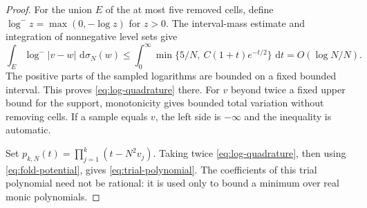 \documentclass[11pt,letterpaper]{article}
\theoremstyle{definition}
\newcommand{\dd}{\,\mathrm d}
\begin{document}
\begin{proof}
For the union $E$ of the at most five removed cells, define
$\log^-z=\max(0,-\log z)$ for $z>0$. The interval-mass estimate and
integration of nonnegative level sets give
\[
 \int_E\log^-|v-w|\,\dd\sigma_N(w)
 \le\int_0^\infty
   \min\{5/N,\ C(1+t)e^{-t/2}\}\,\dd t
 =O(\log N/N).
\]
The positive parts of the sampled logarithms are bounded on a fixed
bounded interval. This proves \eqref{eq:log-quadrature} there. For $v$
beyond twice a fixed upper bound for the support, monotonicity gives
bounded total variation without removing cells. If a sample equals $v$,
the left side is $-\infty$ and the inequality is automatic.

Set $p_{k,N}(t)=\prod_{j=1}^k(t-N^2v_j)$. Taking twice
\eqref{eq:log-quadrature}, then using \eqref{eq:fold-potential}, gives
\eqref{eq:trial-polynomial}. The coefficients of this trial polynomial
need not be rational: it is used only to bound a minimum over real
monic polynomials.
\end{proof}
\end{document}
